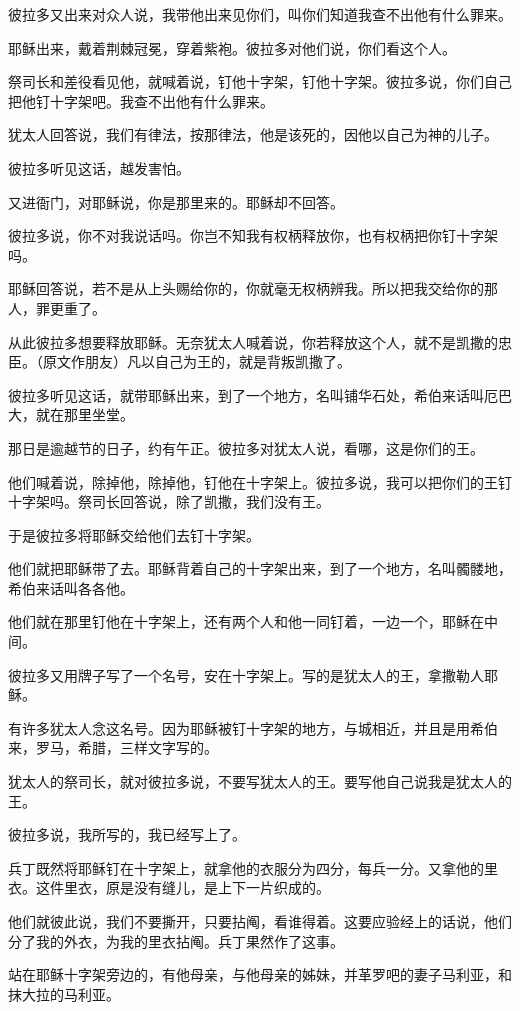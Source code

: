 \documentclass[12pt,oneside]{book}
\begin{document}
彼拉多又出来对众人说，我带他出来见你们，叫你们知道我查不出他有什么罪来。

耶稣出来，戴着荆棘冠冕，穿着紫袍。彼拉多对他们说，你们看这个人。

祭司长和差役看见他，就喊着说，钉他十字架，钉他十字架。彼拉多说，你们自己把他钉十字架吧。我查不出他有什么罪来。

犹太人回答说，我们有律法，按那律法，他是该死的，因他以自己为神的儿子。

彼拉多听见这话，越发害怕。

又进衙门，对耶稣说，你是那里来的。耶稣却不回答。

彼拉多说，你不对我说话吗。你岂不知我有权柄释放你，也有权柄把你钉十字架吗。

耶稣回答说，若不是从上头赐给你的，你就毫无权柄辨我。所以把我交给你的那人，罪更重了。

从此彼拉多想要释放耶稣。无奈犹太人喊着说，你若释放这个人，就不是凯撒的忠臣。（原文作朋友）凡以自己为王的，就是背叛凯撒了。

彼拉多听见这话，就带耶稣出来，到了一个地方，名叫铺华石处，希伯来话叫厄巴大，就在那里坐堂。

那日是逾越节的日子，约有午正。彼拉多对犹太人说，看哪，这是你们的王。

他们喊着说，除掉他，除掉他，钉他在十字架上。彼拉多说，我可以把你们的王钉十字架吗。祭司长回答说，除了凯撒，我们没有王。

于是彼拉多将耶稣交给他们去钉十字架。

他们就把耶稣带了去。耶稣背着自己的十字架出来，到了一个地方，名叫髑髅地，希伯来话叫各各他。

他们就在那里钉他在十字架上，还有两个人和他一同钉着，一边一个，耶稣在中间。

彼拉多又用牌子写了一个名号，安在十字架上。写的是犹太人的王，拿撒勒人耶稣。

有许多犹太人念这名号。因为耶稣被钉十字架的地方，与城相近，并且是用希伯来，罗马，希腊，三样文字写的。

犹太人的祭司长，就对彼拉多说，不要写犹太人的王。要写他自己说我是犹太人的王。

彼拉多说，我所写的，我已经写上了。

兵丁既然将耶稣钉在十字架上，就拿他的衣服分为四分，每兵一分。又拿他的里衣。这件里衣，原是没有缝儿，是上下一片织成的。

他们就彼此说，我们不要撕开，只要拈阄，看谁得着。这要应验经上的话说，他们分了我的外衣，为我的里衣拈阄。兵丁果然作了这事。

站在耶稣十字架旁边的，有他母亲，与他母亲的姊妹，并革罗吧的妻子马利亚，和抹大拉的马利亚。
\end{document}

